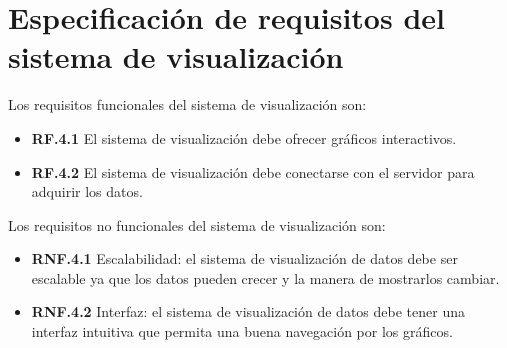 \section{Especificación de requisitos del sistema de visualización}

Los requisitos funcionales del sistema de visualización son:

\begin{itemize}
	\item \textbf{RF.4.1} El sistema de visualización debe ofrecer gráficos interactivos.
	\item \textbf{RF.4.2} El sistema de visualización debe conectarse con el servidor para adquirir los datos.
\end{itemize}

Los requisitos no funcionales del sistema de visualización son:

\begin{itemize}
		\item \textbf{RNF.4.1} Escalabilidad: el sistema de visualización de datos debe ser escalable ya que los datos pueden crecer y la manera de mostrarlos cambiar.
		\item \textbf{RNF.4.2} Interfaz: el sistema de visualización de datos debe tener una interfaz intuitiva que permita una buena navegación por los gráficos.
\end{itemize}
